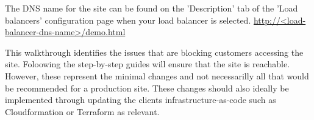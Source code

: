\FloatBarrier


The DNS name for the site can be found on the 'Description' tab of the 'Load balancers' configuration page when your load balancer is selected.
\newline
\newline
\url{http://<load-balancer-dns-name>/demo.html}
\newline
\newline





\FloatBarrier


This walkthrough identifies the issues that are blocking customers accessing the site. Foloowing the step-by-step guides will ensure that the site is reachable. However, these represent the minimal changes and not necessarilly all that would be recommended for a production site. These changes should also ideally be implemented through updating the clients infrastructure-as-code such as Cloudformation or Terraform as relevant.
